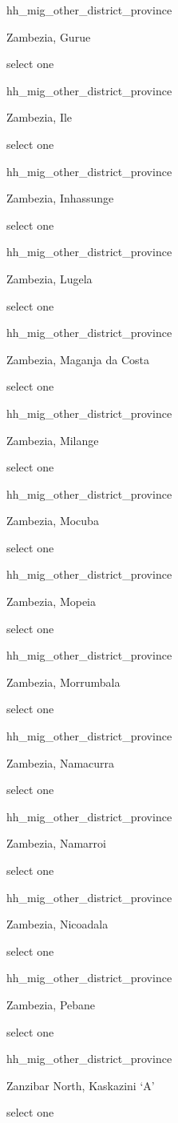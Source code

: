 \documentclass[]{article}
\begin{document}
hh\_mig\_other\_district\_province

Zambezia, Gurue

select one

hh\_mig\_other\_district\_province

Zambezia, Ile

select one

hh\_mig\_other\_district\_province

Zambezia, Inhassunge

select one

hh\_mig\_other\_district\_province

Zambezia, Lugela

select one

hh\_mig\_other\_district\_province

Zambezia, Maganja da Costa

select one

hh\_mig\_other\_district\_province

Zambezia, Milange

select one

hh\_mig\_other\_district\_province

Zambezia, Mocuba

select one

hh\_mig\_other\_district\_province

Zambezia, Mopeia

select one

hh\_mig\_other\_district\_province

Zambezia, Morrumbala

select one

hh\_mig\_other\_district\_province

Zambezia, Namacurra

select one

hh\_mig\_other\_district\_province

Zambezia, Namarroi

select one

hh\_mig\_other\_district\_province

Zambezia, Nicoadala

select one

hh\_mig\_other\_district\_province

Zambezia, Pebane

select one

hh\_mig\_other\_district\_province

Zanzibar North, Kaskazini `A'

select one
\end{document}
